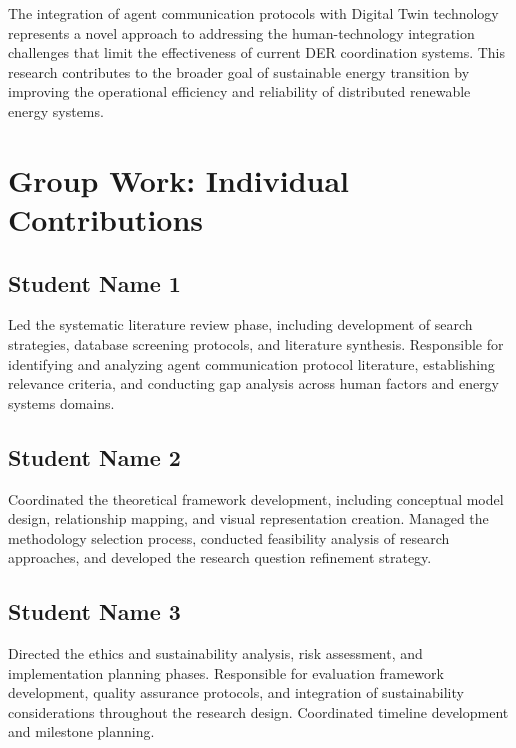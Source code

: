 \documentclass[12pt,a4paper]{article}
\begin{document}
The integration of agent communication protocols with Digital Twin technology represents a novel approach to addressing the human-technology integration challenges that limit the effectiveness of current DER coordination systems. This research contributes to the broader goal of sustainable energy transition by improving the operational efficiency and reliability of distributed renewable energy systems.

\printbibliography

\section*{Group Work: Individual Contributions}
\label{sec:contributions}

\subsection*{Student Name 1}
Led the systematic literature review phase, including development of search strategies, database screening protocols, and literature synthesis. Responsible for identifying and analyzing agent communication protocol literature, establishing relevance criteria, and conducting gap analysis across human factors and energy systems domains.

\subsection*{Student Name 2}
Coordinated the theoretical framework development, including conceptual model design, relationship mapping, and visual representation creation. Managed the methodology selection process, conducted feasibility analysis of research approaches, and developed the research question refinement strategy.

\subsection*{Student Name 3}
Directed the ethics and sustainability analysis, risk assessment, and implementation planning phases. Responsible for evaluation framework development, quality assurance protocols, and integration of sustainability considerations throughout the research design. Coordinated timeline development and milestone planning.
\end{document}
